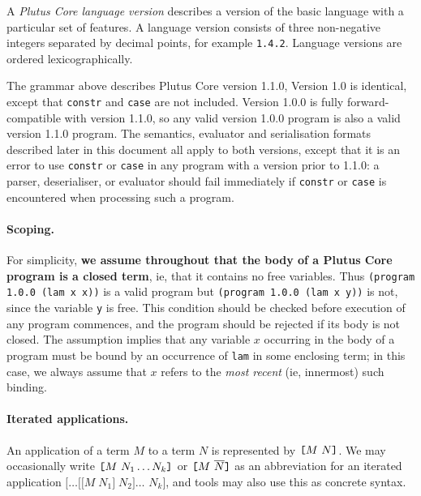 A \textit{Plutus Core language version} describes a version of
the basic language with a particular set of features. A language version
consists of three non-negative integers separated by decimal points, for
example \texttt{1.4.2}. Language versions are ordered lexicographically.

The grammar above describes Plutus Core version 1.1.0, Version 1.0
is identical, except that \texttt{constr}
and \texttt{case} are not included.  Version 1.0.0 is fully forward-compatible
with version 1.1.0, so any valid version 1.0.0 program is also a valid version
1.1.0 program.  The semantics, evaluator and serialisation formats described
later in this document all apply to both versions, except that it is an error to
use \texttt{constr} or \texttt{case} in any program with a version prior to
1.1.0: a parser, deserialiser, or evaluator should fail immediately if
\texttt{constr} or \texttt{case} is encountered when processing such a program.

\paragraph{Scoping.} For simplicity, \textbf{we assume throughout that the body of a
Plutus Core program is a closed term}, ie, that it contains no free variables.
Thus \texttt{(program 1.0.0 (lam x x))} is a valid program but \texttt{(program
  1.0.0 (lam x y))} is not, since the variable \texttt{y} is free. This
condition should be checked before execution of any program commences, and the
program should be rejected if its body is not closed.  The assumption implies
that any variable $x$ occurring in the body of a program must be bound by an
occurrence of \texttt{lam} in some enclosing term; in this case, we always
assume that $x$ refers to the \textit{most recent} (ie, innermost) such binding.

\paragraph{Iterated applications.}
An application of a term $M$ to a term $N$ is represented by
$\texttt{[} M ~ N \texttt{]}$. We may occasionally write
$\texttt{[} M ~ N_1 \ldots N_k \texttt{]}$ or
$\texttt{[} M ~ \overline{N} \texttt{]}$ as an abbreviation for an iterated application
$\mathtt{[}\ldots\mathtt{[[}M\;N_1\mathtt{]}\;N_2\mathtt{]}\ldots $  %
  $N_k\mathtt{]}$,
and tools may also use this as concrete syntax.


